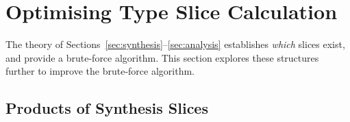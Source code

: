 \section{Optimising Type Slice Calculation}
\label{sec:algorithms}

\sectionlegend

\providecommand{\tmslice}[2]{\mathit{TermMin}\;#1 \mathbin{\blacktriangleleft} #2}
\providecommand{\mintmslice}[2]{\mathit{MinTermMin}\;#1 \mathbin{\blacktriangleleft} #2}
\providecommand{\tmcalc}[5]{#1 \mathbin{{\color{BrickRed}\blacktriangleleft}} #2 \;{\color{BrickRed}\rightsquigarrow}\; #3 \mathbin{{\color{BrickRed}\Uparrow}} #4 \,\dashv\, #5}
\providecommand{\tmrule}[7][\Delta;\,\Gamma]{%
  #1 \vdash #2 \mathbin{{\color{BrickRed}\Uparrow}} #3
  \mathbin{{\color{BrickRed}\blacktriangleleft}} #4
  \;{\color{BrickRed}\rightsquigarrow}\; #5
  \mathbin{{\color{BrickRed}\Uparrow}} #6
  \,\dashv\, #7%
}

\providecommand{\stkU}[2]{%
  \tikz[baseline=(N.base)]{%
    \node[inner sep=0pt, outer sep=0pt] (N) {\strut$#2$};%
    \foreach \col/\off in {#1}{%
      \draw[\col, line width=1.2pt, line cap=butt, overlay]
        ([xshift=-3pt,yshift=\off]N.south west) -- ([xshift=3pt,yshift=\off]N.south east);%
    }%
    \path ([yshift=-10pt]N.south west) ([yshift=-10pt]N.south east);%
  }%
}
\providecommand{\tokensp}{\mskip8mu}
\providecommand{\sABCD}[1]{\stkU{BrickRed/-1pt,NavyBlue/-3.4pt,OliveGreen/-5.8pt,Mulberry/-8.2pt}{#1}}
\providecommand{\sABC}[1]{\stkU{BrickRed/-1pt,NavyBlue/-3.4pt,OliveGreen/-5.8pt}{#1}}
\providecommand{\sABD}[1]{\stkU{BrickRed/-1pt,NavyBlue/-3.4pt,Mulberry/-8.2pt}{#1}}
\providecommand{\sAC}[1]{\stkU{BrickRed/-1pt,OliveGreen/-5.8pt}{#1}}
\providecommand{\sAD}[1]{\stkU{BrickRed/-1pt,Mulberry/-8.2pt}{#1}}
\providecommand{\sBC}[1]{\stkU{NavyBlue/-3.4pt,OliveGreen/-5.8pt}{#1}}
\providecommand{\sBD}[1]{\stkU{NavyBlue/-3.4pt,Mulberry/-8.2pt}{#1}}
\providecommand{\sC}[1]{\stkU{OliveGreen/-5.8pt}{#1}}
\providecommand{\sD}[1]{\stkU{Mulberry/-8.2pt}{#1}}
\providecommand{\sPone}[1]{\stkU{OliveGreen/-1pt}{#1}}
\providecommand{\sPtwo}[1]{\stkU{Mulberry/-3.4pt}{#1}}
\providecommand{\sPboth}[1]{\stkU{OliveGreen/-1pt,Mulberry/-3.4pt}{#1}}

\bigskip
\noindent The theory of Sections~\ref{sec:synthesis}--\ref{sec:analysis} establishes \textit{which} slices exist, and provide a brute-force algorithm. This section explores these structures further to improve the brute-force algorithm.

\subsection{\yo Products of Synthesis Slices}
\label{sec:product-revisited}

